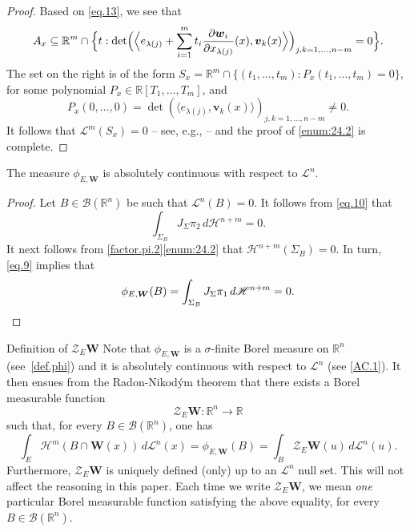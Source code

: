 \documentclass[JEP,XML,SOM,Unicode,ThmDefs,NoEqCountersInSection]{cedram}
\newenvironment{Empty}[2][\null]{%
\begin{enonce}[remark]{#1}#2}
{\end{enonce}}
\newcommand{\R}{\mathbb{R}}
\newcommand{\Rm}{\R^m}
\newcommand{\Rn}{\R^n}
\newcommand{\calB}{\mathscr{B}}
\newcommand{\calH}{\mathscr{H}}
\newcommand{\calL}{\mathscr{L}}
\newcommand{\calZ}{\mathscr{Z}}
\newcommand{\bW}{{\boldsymbol{W}}}
\newcommand{\bv}{{\boldsymbol{v}}}
\newcommand{\bw}{{\boldsymbol{w}}}
\let\la\langle
\let\ra\rangle
\let\subset\subseteq
\begin{document}
\begin{proof}
Based on \eqref{eq.13}, we see that
\begin{equation*}
A_x \subset \Rm \cap \Bigl\{ t: \det \Bigl(\Bigl\la e_{\lambda(j)} + \sum_{i=1}^m t_i \dfrac{\partial \bw_i}{\partial x_{\lambda(j)}}(x), \bv_k(x) \Bigr\ra\Bigr)_{j,k=1,\ldots,n-m}=0\Bigr\}.
\end{equation*}
The set on the right is of the form $S_x = \Rm \cap \{ (t_1,\ldots,t_m): P_x(t_1,\ldots,t_m) = 0 \}$, for some polynomial $P_x \in \R[T_1,\ldots,T_m]$, and
\[
P_x(0,\ldots,0) = \det\left(\la e_{\lambda(j)},\bv_k(x) \ra\right)_{j,k=1,\ldots,n-m} \neq 0.
\]
It follows that $\calL^m(S_x)=0$ -- see, e.g., \cite[2.6.5]{GMT} -- and the proof of \eqref{enum:24.2} is complete.
\end{proof}

\begin{Proposition}
\label{AC.1}
The measure $\phi_{E,\bW}$ is absolutely continuous with respect to $\calL^n$.
\end{Proposition}

\begin{proof}
Let $B \in \calB(\Rn)$ be such that $\calL^n(B)=0$.
It follows from \eqref{eq.10} that
\begin{equation*}
\int_{\Sigma_B} J_\Sigma \pi_2 \,d\calH^{n+m} = 0.
\end{equation*}
It next follows from \ref{factor.pi.2}\eqref{enum:24.2} that $\calH^{n+m}(\Sigma_B)=0$.
In turn, \eqref{eq.9} implies that
\begin{equation*}
\phi_{E,\bW}(B) = \int_{\Sigma_B} J_\Sigma \pi_1 \,d\calH^{n+m} = 0.\qedhere
\end{equation*}
\end{proof}

\begin{Empty}[Definition of $\calZ_E \bW$]
\label{def.Z}
Note that $\phi_{E,\bW}$ is a $\sigma$-finite Borel measure on $\Rn$ (see~\ref{def.phi}) and it is absolutely continuous with respect to $\calL^n$ (see \ref{AC.1}).
It then ensues from the Radon-Nikod\'ym theorem that there exists a Borel measurable function
\begin{equation*}
\calZ_E \bW: \Rn \to \R
\end{equation*}
such that, for every $B \in \calB(\Rn)$, one has
\begin{equation*}
\int_E \calH^m(B \cap \bW(x)) \,d\calL^n(x) = \phi_{E,\bW}(B) = \int_B \calZ_E \bW(u) \,d\calL^n(u).
\end{equation*}
Furthermore, $\calZ_E \bW$ is uniquely defined (only) up to an $\calL^n$ null set.
This will not affect the reasoning in this paper.
Each time we write $\calZ_E \bW$, we mean \emph{one} particular Borel measurable function satisfying the above equality, for every $B \in \calB(\Rn)$.
\end{Empty}
\end{document}
